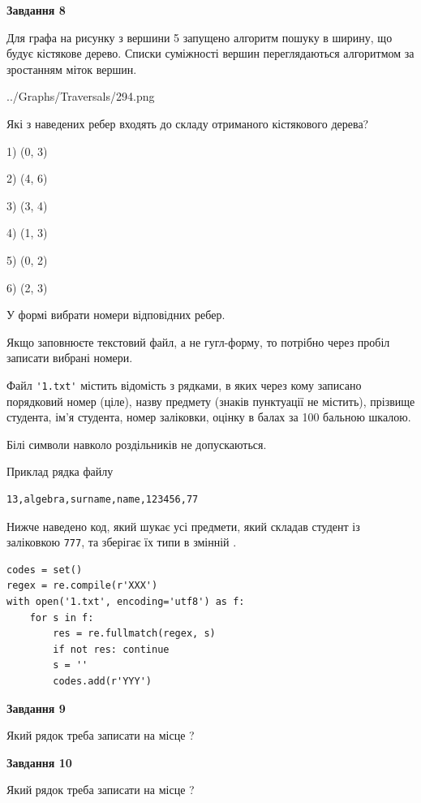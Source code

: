 \documentclass[12pt, ukrainian]{article}
\def\code#1{\Verb!#1!}
\begin{document}
{\begin {large}
{\begin {center}\textbf{Завдання 8}\end {center}}\par
Для графа на рисунку з вершини 5 запущено алгоритм пошуку в ширину, що будує кістякове дерево. Списки суміжності вершин переглядаються алгоритмом за зростанням міток вершин.\par
\begin{center}
	{../Graphs/Traversals/294.png}
\end{center}
\par Які з наведених ребер входять до складу отриманого кістякового дерева?\par
1) (0, 3)\par
2) (4, 6)\par
3) (3, 4)\par
4) (1, 3)\par
5) (0, 2)\par
6) (2, 3)\par
{\vskip 15pt} У формі вибрати номери відповідних ребер.


Якщо заповнюєте текстовий файл, а не гугл-форму, то потрібно через пробіл записа\-ти вибрані номери.\par
\newpage


Файл \code{'1.txt'} містить відомість з рядками, в яких через кому записано поряд\-ковий номер (ціле), назву предмету (знаків пунктуації не містить), прізвище студента, ім'я студента, номер заліковки, оцінку в балах за 100 бальною шкалою.

Білі символи навколо роздільників не допускаються.

Приклад рядка файлу



\begin{verbatim}
13,algebra,surname,name,123456,77
\end{verbatim}


Нижче наведено код, який шукає усі предмети, який складав студент із заліковкою \code{777}, та зберігає їх типи в змінній .



\begin{verbatim}
codes = set()
regex = re.compile(r'XXX')
with open('1.txt', encoding='utf8') as f:
    for s in f:
        res = re.fullmatch(regex, s)
        if not res: continue
        s = ''
        codes.add(r'YYY')
\end{verbatim}


{\begin {center}\textbf{Завдання 9}\end {center}}\par
Який рядок треба записати на місце  ?\par
\vspace{5mm}


{\begin {center}\textbf{Завдання 10}\end {center}}\par
Який рядок треба записати на місце  ?\par


\newpage


\end {large}}
\end{document}
